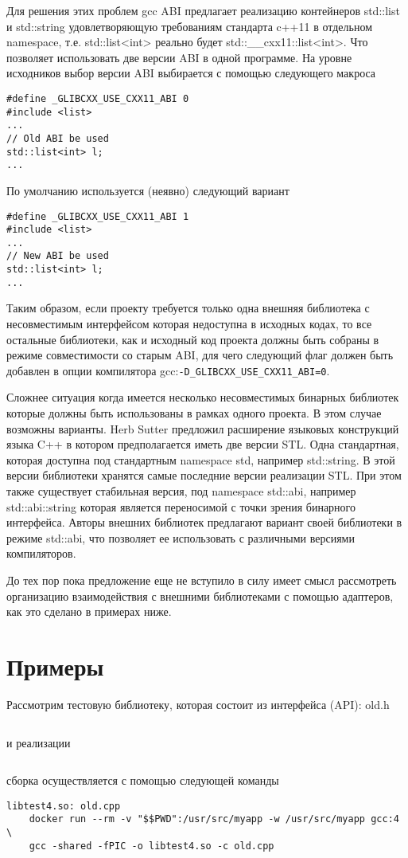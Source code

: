 \documentclass[14pt,a4paper]{article}
\begin{document}
Для решения этих проблем gcc ABI предлагает реализацию контейнеров
std::list и std::string
удовлетворяющую требованиям стандарта c++11 
 в отдельном namespace, т.е. std::list<int> реально будет 
std::\_\_cxx11::list<int>. Что позволяет использовать две версии ABI в
одной программе. На уровне исходников выбор версии ABI выбирается с помощью
следующего макроса
\begin{verbatim}
#define _GLIBCXX_USE_CXX11_ABI 0
#include <list>
...
// Old ABI be used
std::list<int> l;
...
\end{verbatim} 

По умолчанию используется (неявно) следующий вариант
\begin{verbatim}
#define _GLIBCXX_USE_CXX11_ABI 1
#include <list>
...
// New ABI be used
std::list<int> l;
...
\end{verbatim} 

Таким образом, если проекту требуется только одна внешняя библиотека с
несовместимым интерфейсом которая недоступна в исходных кодах, то все
остальные библиотеки, как и исходный код проекта должны быть собраны в
режиме совместимости со старым ABI, для чего следующий флаг должен быть
добавлен в опции компилятора gcc:\texttt{-D\_GLIBCXX\_USE\_CXX11\_ABI=0}. 

Сложнее ситуация когда имеется несколько несовместимых бинарных
библиотек которые должны быть использованы в рамках одного проекта.
В этом случае возможны варианты. Herb Sutter предложил \cite{sutter}
расширение языковых конструкций языка C++ в котором предполагается
иметь две версии STL. Одна стандартная, которая доступна под
стандартным namespace std, например std::string. В этой версии
библиотеки хранятся самые последние версии реализации STL. При этом
также существует стабильная версия, под namespace std::abi, например
std::abi::string которая является переносимой с точки зрения бинарного
интерфейса. Авторы внешних библиотек предлагают вариант своей
библиотеки в режиме std::abi, что позволяет ее использовать с
различными версиями компиляторов.

До тех пор пока предложение \cite{sutter} еще не вступило в силу имеет
смысл рассмотреть организацию взаимодействия с внешними библиотеками с
помощью адаптеров, как это сделано в примерах ниже.

\section{Примеры}

Рассмотрим тестовую библиотеку, которая состоит из интерфейса (API):
old.h
\inputminted{c++}{./src/old.h}
и реализации 
\inputminted{c++}{./src/old.cpp}
сборка осуществляется с помощью следующей команды
\begin{verbatim}
libtest4.so: old.cpp
	docker run --rm -v "$$PWD":/usr/src/myapp -w /usr/src/myapp gcc:4 \
	gcc -shared -fPIC -o libtest4.so -c old.cpp
\end{verbatim}
\end{document}
